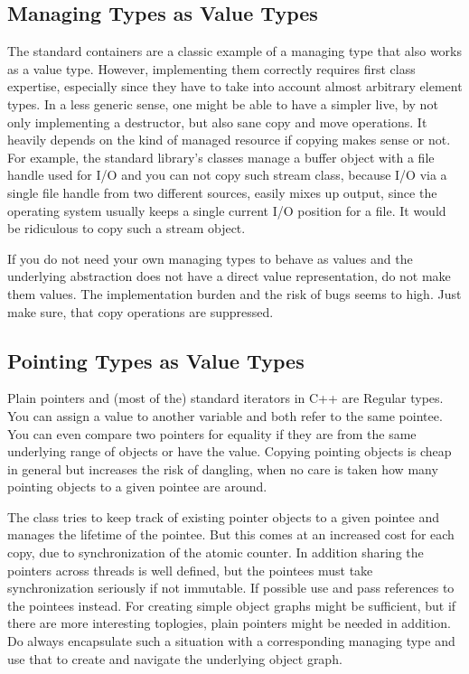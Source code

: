 \documentclass[ebook,11pt,article]{memoir}
\begin{document}
\subsection{Managing Types as Value Types}
The standard containers are a classic example of a managing type that also works as a value type. However, implementing them correctly requires first class expertise, especially since they have to take into account almost arbitrary element types. In a less generic sense, one might be able to have a simpler live, by not only implementing a destructor, but also sane copy and move operations. It heavily depends on the kind of managed resource if copying makes sense or not. For example, the standard library's  classes  manage a buffer object with a file handle used for I/O and you can not copy such stream class, because I/O via a single file handle from two different sources, easily mixes up output, since the operating system usually keeps a single current I/O position for a file. It would be ridiculous to copy such a stream object.

If you do not need your own managing types to behave as values and the underlying abstraction does not have a direct value representation, do not make them values. The implementation burden and the risk of bugs seems to high. Just make sure, that copy operations are suppressed.

\subsection{Pointing Types as Value Types}
Plain pointers and (most of the) standard iterators in C++ are Regular types. You can assign a value to another variable and both refer to the same pointee. You can even compare two pointers for equality if they are from the same underlying range of objects or have the  value. Copying pointing objects is cheap in general but increases the risk of dangling, when no care is taken how many pointing objects to a given pointee are around. 

The class  tries to keep track of existing pointer objects to a given pointee and manages the lifetime of the pointee. But this comes at an increased cost for each copy, due to synchronization of the atomic counter. In addition sharing the pointers across threads is well defined, but the pointees must take synchronization seriously if not immutable. If possible use  and pass references to the pointees instead. For creating simple object graphs  might be sufficient, but if there are more interesting toplogies, plain pointers might be needed in addition. Do always encapsulate such a situation with a corresponding managing type and use that to create and navigate the underlying object graph.
\end{document}
